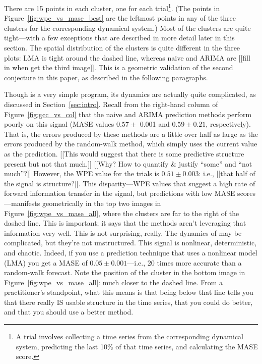 There are 15 points in each cluster, one for each trial\footnote{A
  trial involves collecting a time series from the corresponding
  dynamical system, predicting the last 10\% of that time series, and
  calculating the MASE score.}.  (The points in
Figure~\ref{fig:wpe_vs_mase_best} are the leftmost points in any of
the three clusters for the corresponding dynamical system.)  Most of
the clusters are quite tight---with a few exceptions that are
described in more detail later in this section.  The spatial
distribution of the clusters is quite different in the three plots:
LMA is tight around the dashed line, whereas naive and ARIMA are
[[fill in when get the third image]].  This is a geometric validation
of the second conjecture in this paper, as described in the following
paragraphs.

Though \col is a very simple program, its dynamics are actually quite
complicated, as discussed in Section~\ref{sec:intro}.  Recall from the
right-hand column of Figure~\ref{fig:gcc_vs_col} that the naive and
ARIMA prediction methods perform poorly on this signal (MASE values
$0.57 \pm$ 0.001 and $0.59 \pm 0.21$, respectively).  That is, the
errors produced by these methods are a little over half as large as
the errors produced by the random-walk method, which simply uses the
current value as the prediction.  {\color{red} [[This would suggest
      that there is some predictive structure present but not that
      much.]] [[Why?  How to quantify \& justify ``some'' and ``not
      much''?]]}  However, the WPE value for the \col trials is $0.51
\pm 0.003$: i.e., {\color{red} [[that half of the signal is
      structure?]]}.  This disparity---WPE values that suggest a high
rate of forward information transfer in the signal, but predictions
with low MASE scores---manifests geometrically in the top two images
in Figure~\ref{fig:wpe_vs_mase_all}, where the \col clusters are far
to the right of the dashed line.  This is important; it says that the
methods aren't leveraging that information very well.  This is not
surprising, really.  The dynamics of \col may be complicated, but
they're not unstructured.  This signal is nonlinear, deterministic,
and chaotic.  Indeed, if you use a prediction technique that uses a
nonlinear model (LMA) you get a MASE of $0.05 \pm 0.001$---i.e., 20
times more accurate than a random-walk forecast.  Note the position of
the \col cluster in the bottom image in
Figure~\ref{fig:wpe_vs_mase_all}: much closer to the dashed line.
From a practitioner's standpoint, what this means is that being below
that line tells you that there really IS usable structure in the time
series, that you could do better, and that you should use a better
method.

